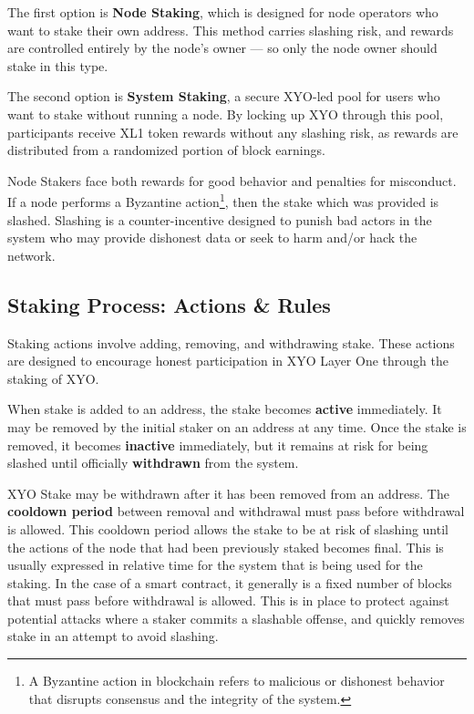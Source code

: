 \documentclass{article}
\begin{document}
The first option is \textbf{Node Staking}, which is designed for node operators who want to stake their own address. This method carries slashing risk, and rewards are controlled entirely by the node's owner — so only the node owner should stake in this type. 

The second option is \textbf{System Staking}, a secure XYO-led pool for users who want to stake without running a node. By locking up XYO through this pool, participants receive XL1 token rewards without any slashing risk, as rewards are distributed from a randomized portion of block earnings.

Node Stakers face both rewards for good behavior and penalties for misconduct. If a node performs a Byzantine action\footnote{A Byzantine action in blockchain refers to malicious or dishonest behavior that disrupts consensus and the integrity of the system.}, then the stake which was provided is slashed. Slashing is a counter-incentive designed to punish bad actors in the system who may provide dishonest data or seek to harm and/or hack the network.

\subsection{Staking Process: Actions \& Rules}
Staking actions involve adding, removing, and withdrawing stake. These actions are designed to encourage honest participation in XYO Layer One through the staking of XYO. 

When stake is added to an address, the stake becomes \textbf{active} immediately. It may be removed by the initial staker on an address at any time. Once the stake is removed, it becomes \textbf{inactive} immediately, but it remains at risk for being slashed until officially \textbf{withdrawn} from the system. 

XYO Stake may be withdrawn after it has been removed from an address. The \textbf{cooldown period} between removal and withdrawal must pass before withdrawal is allowed. This cooldown period allows the stake to be at risk of slashing until the actions of the node that had been previously staked becomes final. This is usually expressed in relative time for the system that is being used for the staking. In the case of a smart contract, it generally is a fixed number of blocks that must pass before withdrawal is allowed. This is in place to protect against potential attacks where a staker commits a slashable offense, and quickly removes stake in an attempt to avoid slashing.
\end{document}
